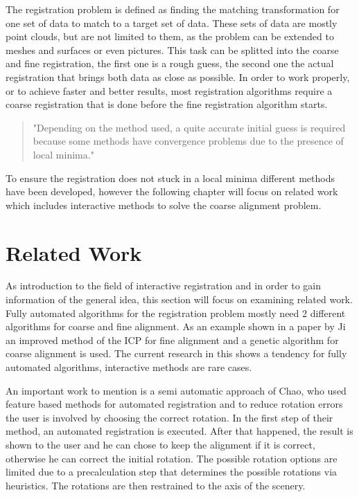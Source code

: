\documentclass[hyperref,english,bachelorofscience,bibnum,twoside]{cgvpub}
\begin{document}
The registration problem is defined as finding the matching transformation for one set of data to match to a target set of data\cite{Ji2017}. These sets of data are mostly point clouds, but are not limited to them, as the problem can be extended to meshes and surfaces or even pictures\cite{Salvi2007}.
This task can be splitted into the coarse and fine registration, the first one is a rough guess, the second one the actual registration that brings both data as close as possible.
In order to work properly, or to achieve faster and better results, most registration algorithms require a coarse registration that is done before the fine registration algorithm starts. 
\begin{quote}
"Depending on the method used, a quite accurate initial
guess is required because some methods have convergence
problems due to the presence of local minima."\cite{Salvi2007}
\end{quote}

To ensure the registration does not stuck in a local minima different methods have been developed, however the following chapter will focus on related work which includes interactive methods to solve the coarse alignment problem.

\section{Related Work}

As introduction to the field of interactive registration and in order to gain information of the general idea, this section will focus on examining related work. Fully automated algorithms for the registration problem mostly need 2 different algorithms for coarse and fine alignment. As an example shown in a paper by Ji \cite{Ji2017} an improved method of the ICP for fine alignment and a genetic algorithm for coarse alignment is used. The current research in this shows a tendency for fully automated algorithms, interactive methods are rare cases.

An important work to mention is a semi automatic approach of Chao, who used feature based methods for automated registration and to reduce rotation errors the user is involved by choosing the correct rotation.\cite{Chao}
In the first step of their method, an automated registration is executed. After that happened, the result is shown to the user and he can chose to keep the alignment if it is correct, otherwise he can correct the initial rotation. The possible rotation options are limited due to a precalculation step that determines the possible rotations via heuristics. The rotations are then restrained to the axis of the scenery.\cite{Chao}
\end{document}
